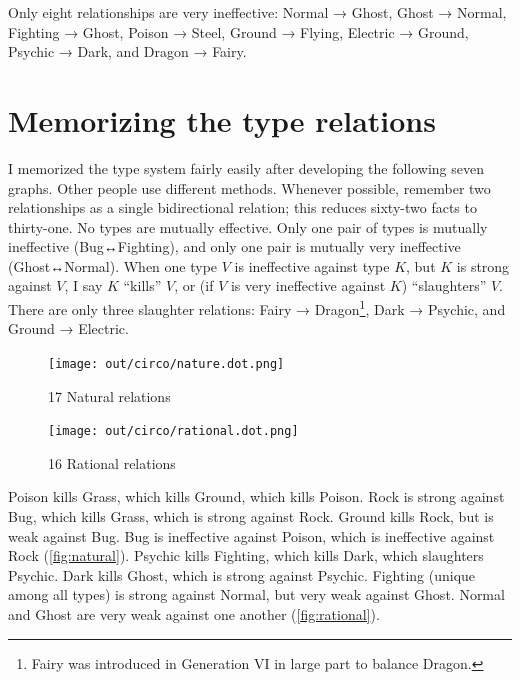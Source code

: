 Only eight relationships are very ineffective:
Normal → Ghost,
Ghost → Normal,
Fighting → Ghost,
Poison → Steel,
Ground → Flying,
Electric → Ground,
Psychic → Dark,
and Dragon → Fairy.

\section{Memorizing the type relations}
I memorized the type system fairly easily after developing the following seven graphs.
Other people use different methods.
Whenever possible, remember two relationships as a single bidirectional relation;
  this reduces sixty-two facts to thirty-one.
No types are mutually effective.
Only one pair of types is mutually ineffective (Bug↔Fighting),
  and only one pair is mutually very ineffective (Ghost↔Normal).
When one type $V$ is ineffective against type $K$, but $K$ is strong
 against $V$, I say $K$ ``kills'' $V$, or
 (if $V$ is very ineffective against $K$) ``slaughters'' $V$.
There are only three slaughter relations: Fairy → Dragon\footnote{Fairy was
  introduced in Generation VI in large part to balance Dragon.}, Dark → Psychic,
  and Ground → Electric.

\begin{figure}[h!]
  \begin{minipage}[t]{0.5\textwidth}
    \begin{center}
    \texttt{[image: out/circo/nature.dot.png]}
    \end{center}
    \caption{17 Natural relations}
    \label{fig:natural}
  \end{minipage}
  \begin{minipage}[t]{0.5\textwidth}
    \begin{center}
    \texttt{[image: out/circo/rational.dot.png]}
    \end{center}
    \caption{16 Rational relations}
    \label{fig:rational}
  \end{minipage}
\end{figure}
\noindent{}Poison kills Grass, which kills Ground, which kills Poison.
Rock is strong against Bug, which kills Grass, which is strong against Rock.
Ground kills Rock, but is weak against Bug.
Bug is ineffective against Poison, which is ineffective against Rock (\autoref{fig:natural}).
Psychic kills Fighting, which kills Dark, which slaughters Psychic.
Dark kills Ghost, which is strong against Psychic.
Fighting (unique among all types) is strong against Normal,
  but very weak against Ghost.
Normal and Ghost are very weak against one another (\autoref{fig:rational}).

